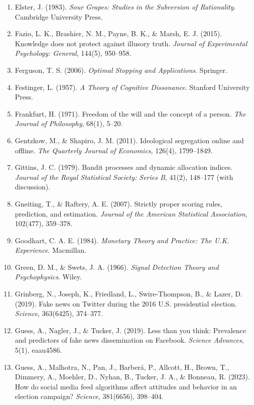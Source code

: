 \documentclass[
  11pt]{article}
\begin{document}
\begin{enumerate}
{  Rationality and Irrationality}. Cambridge University Press.
\item
  Elster, J. (1983). \emph{Sour Grapes: Studies in the Subversion of
  Rationality}. Cambridge University Press.
\item
  Fazio, L. K., Brashier, N. M., Payne, B. K., \& Marsh, E. J. (2015).
  Knowledge does not protect against illusory truth. \emph{Journal of
  Experimental Psychology: General}, 144(5), 950--958.
\item
  Ferguson, T. S. (2006). \emph{Optimal Stopping and Applications}.
  Springer.
\item
  Festinger, L. (1957). \emph{A Theory of Cognitive Dissonance}.
  Stanford University Press.
\item
  Frankfurt, H. (1971). Freedom of the will and the concept of a person.
  \emph{The Journal of Philosophy}, 68(1), 5--20.
\item
  Gentzkow, M., \& Shapiro, J. M. (2011). Ideological segregation online
  and offline. \emph{The Quarterly Journal of Economics}, 126(4),
  1799--1849.
\item
  Gittins, J. C. (1979). Bandit processes and dynamic allocation
  indices. \emph{Journal of the Royal Statistical Society: Series B},
  41(2), 148--177 (with discussion).
\item
  Gneiting, T., \& Raftery, A. E. (2007). Strictly proper scoring rules,
  prediction, and estimation. \emph{Journal of the American Statistical
  Association}, 102(477), 359--378.
\item
  Goodhart, C. A. E. (1984). \emph{Monetary Theory and Practice: The
  U.K. Experience}. Macmillan.
\item
  Green, D. M., \& Swets, J. A. (1966). \emph{Signal Detection Theory
  and Psychophysics}. Wiley.
\item
  Grinberg, N., Joseph, K., Friedland, L., Swire-Thompson, B., \& Lazer,
  D. (2019). Fake news on Twitter during the 2016 U.S. presidential
  election. \emph{Science}, 363(6425), 374--377.
\item
  Guess, A., Nagler, J., \& Tucker, J. (2019). Less than you think:
  Prevalence and predictors of fake news dissemination on Facebook.
  \emph{Science Advances}, 5(1), eaau4586.
\item
  Guess, A., Malhotra, N., Pan, J., Barberá, P., Allcott, H., Brown, T.,
  Dimmery, A., Moehler, D., Nyhan, B., Tucker, J. A., \& Bonneau, R.
  (2023). How do social media feed algorithms affect attitudes and
  behavior in an election campaign? \emph{Science}, 381(6656), 398--404.

\end{enumerate}
\end{document}
